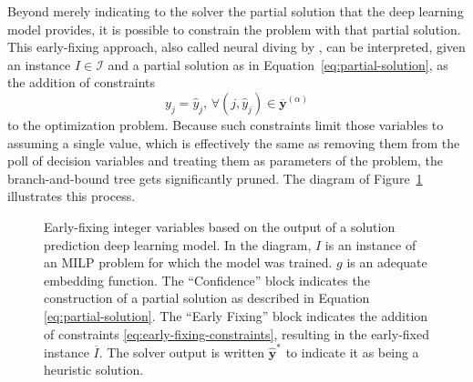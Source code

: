 Beyond merely indicating to the solver the partial solution that the deep learning model provides, it is possible to constrain the problem with that partial solution.
This early-fixing approach, also called neural diving by , can be interpreted, given an instance $I\in \mathcal{I}$ and a partial solution as in Equation~\eqref{eq:partial-solution}, as the addition of constraints
\begin{equation}\label{eq:early-fixing-constraints}
    y_{j} = \hat{y}_j,\,\forall (j,\hat{y}_j) \in \overline{\bm{y}}^{(\alpha)}
\end{equation}
to the optimization problem.
Because such constraints limit those variables to assuming a single value, which is effectively the same as removing them from the poll of decision variables and treating them as parameters of the problem, the branch-and-bound tree gets significantly pruned.
The diagram of Figure~\ref{fig:early-fixing-diagram} illustrates this process.

\begin{figure}[h]
    \centering
    \caption{Early-fixing integer variables based on the output of a solution prediction deep learning model. In the diagram,  $I$ is an instance of an MILP problem for which the model was trained. $g$ is an adequate embedding function. The ``Confidence'' block indicates the construction of a partial solution as described in Equation \eqref{eq:partial-solution}. The ``Early Fixing'' block indicates the addition of constraints \eqref{eq:early-fixing-constraints}, resulting in the early-fixed instance $\overline{I}$. The solver output is written $\hat{\bm{y}}^*$ to indicate it as being a heuristic solution.}
    \label{fig:early-fixing-diagram}
\end{figure}

